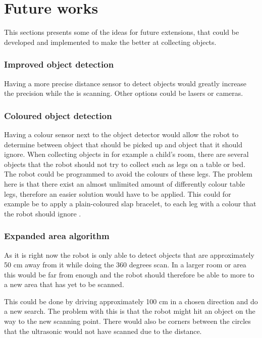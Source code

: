\section{Future works} \label{sec:future_works}
This sections presents some of the ideas for future extensions, that could be developed and implemented to make the \projname{} better at collecting objects. 

\subsubsection{Improved object detection}
Having a more precise distance sensor to detect objects would greatly increase the precision while the \projname{} is scanning. Other options could be lasers or cameras.

\subsubsection{Coloured object detection}
Having a colour sensor next to the object detector would allow the robot to determine between object that should be picked up and object that it should ignore. When collecting objects in for example a child's room, there are several objects that the robot should not try to collect such as legs on a table or bed. The robot could be programmed to avoid the colours of these legs. The problem here is that there exist an almost unlimited amount of differently colour table legs, therefore an easier solution would have to be applied. This could for example be to apply a plain-coloured slap bracelet, to each leg with a colour that the robot should ignore \citep{slap_bracelet}.

\subsubsection{Expanded area algorithm}
As it is right now the robot is only able to detect objects that are approximately 50 cm away from it while doing the 360 degrees scan. In a larger room or area this would be far from enough and the robot should therefore be able to more to a new area that has yet to be scanned.

This could be done by driving approximately 100 cm in a chosen direction and do a new search. The problem with this is that the robot might hit an object on the way to the new scanning point. There would also be corners between the circles that the ultrasonic would not have scanned due to the distance.

